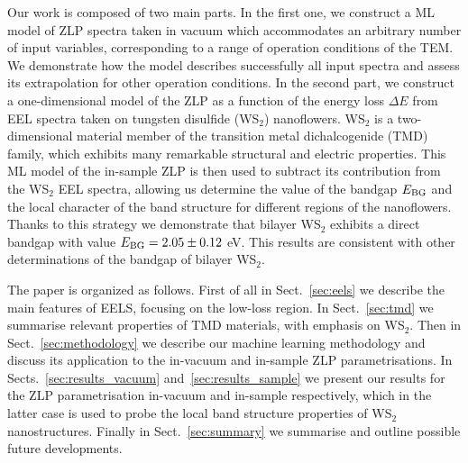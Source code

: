 Our work is composed of two main parts.
%
In the first one, we construct a ML model of ZLP spectra taken
in vacuum which accommodates an  arbitrary number of input
variables, corresponding to a range of operation conditions of the TEM.
%
We demonstrate how the model describes successfully all
input spectra and assess its extrapolation for other operation
conditions.
%
In the second part, we construct a one-dimensional model
of the ZLP as a function of the energy loss $\Delta E$ from EEL spectra taken on
tungsten disulfide (WS$_2$) nanoflowers.
%
WS$_2$ is a two-dimensional material member of the transition metal dichalcogenide (TMD) family,
which exhibits many remarkable structural and electric properties.
%
This ML model of the in-sample ZLP is then used to subtract its contribution
from the WS$_2$ EEL spectra, allowing us determine the value of the bandgap $E_{\rm BG}$
and the local character of the band structure for different regions of the nanoflowers.
%
Thanks to this strategy  we demonstrate that bilayer WS$_2$ exhibits a direct bandgap
with value $E_{\rm BG}= 2.05 \pm 0.12$ eV.
%
This results are consistent with other determinations of the bandgap of bilayer WS$_2$.

The paper is organized as follows.
%
First of all in Sect.~\ref{sec:eels}
we describe the main features of EELS, focusing on the low-loss region.
%
In Sect.~\ref{sec:tmd} we summarise relevant properties of TMD materials,
with emphasis on WS$_2$.
%
Then in Sect.~\ref{sec:methodology} we describe our machine learning methodology
and discuss its application to the in-vacuum and in-sample
ZLP parametrisations.
%
In Sects.~\ref{sec:results_vacuum} and~\ref{sec:results_sample}
we present our results for the ZLP parametrisation
in-vacuum and in-sample respectively, which in the latter
case is used to probe the local band structure properties
of WS$_2$ nanostructures.
%
Finally in Sect.~\ref{sec:summary} we summarise
and outline possible future developments.
